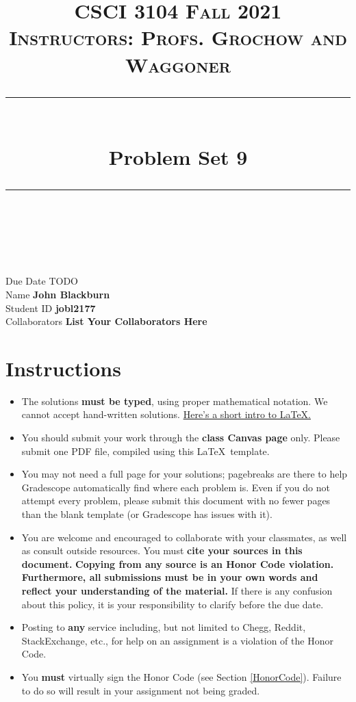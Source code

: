 \documentclass[11pt]{article}
\title{
\normalfont \normalsize 
\textsc{CSCI 3104 Fall 2021 \\ 
Instructors: Profs. Grochow and Waggoner} \\
[10pt] 
\rule{\linewidth}{0.5pt} \\[6pt] 
\huge Problem Set 9 \\
\rule{\linewidth}{2pt}  \\[10pt]
}
\date{}
\theoremstyle{definition}
\theoremstyle{definition}
\theoremstyle{definition}
\begin{document}
\maketitle


\noindent
Due Date \dotfill TODO \\
Name \dotfill \textbf{John Blackburn} \\
Student ID \dotfill \textbf{jobl2177} \\
Collaborators \dotfill \textbf{List Your Collaborators Here}

\tableofcontents

\section{Instructions}
 \begin{itemize}
	\item The solutions \textbf{must be typed}, using proper mathematical notation. We cannot accept hand-written solutions. \href{http://ece.uprm.edu/~caceros/latex/introduction.pdf}{Here's a short intro to \LaTeX.}
	\item You should submit your work through the \textbf{class Canvas page} only. Please submit one PDF file, compiled using this \LaTeX \ template.
	\item You may not need a full page for your solutions; pagebreaks are there to help Gradescope automatically find where each problem is. Even if you do not attempt every problem, please submit this document with no fewer pages than the blank template (or Gradescope has issues with it).

	\item You are welcome and encouraged to collaborate with your classmates, as well as consult outside resources. You must \textbf{cite your sources in this document.} \textbf{Copying from any source is an Honor Code violation. Furthermore, all submissions must be in your own words and reflect your understanding of the material.} If there is any confusion about this policy, it is your responsibility to clarify before the due date. 

	\item Posting to \textbf{any} service including, but not limited to Chegg, Reddit, StackExchange, etc., for help on an assignment is a violation of the Honor Code.

	\item You \textbf{must} virtually sign the Honor Code (see Section \ref{HonorCode}). Failure to do so will result in your assignment not being graded.
\end{itemize}
\end{document}
